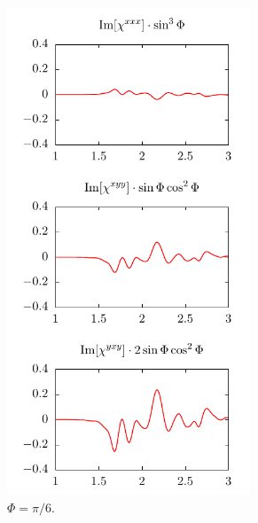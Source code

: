\documentclass[aps,prb,10pt,letterpaper,notitlepage]{revtex4-1}
\begin{document}
\begin{figure}[b]
\begin{subfigure}[b]{0.25\textwidth}
        \includegraphics[width=0.8\textwidth]{rot/comps30.pdf}
        \caption{$\Phi = \pi/6$.}
    \end{subfigure}
    ~ 
    \begin{subfigure}[b]{0.25\textwidth}

\end{subfigure}
\end{figure}
\end{document}
